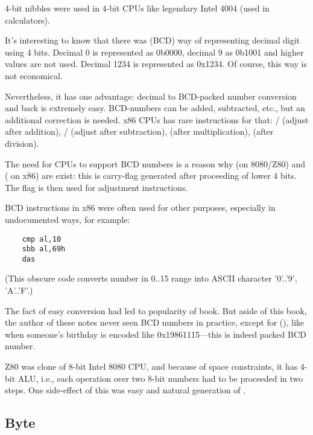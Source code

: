 
4-bit nibbles were used in 4-bit CPUs like legendary Intel 4004 (used in calculators).

It's interesting to know that there was  (\ac{BCD}) way of representing decimal digit using 4 bits.
Decimal 0 is represented as 0b0000, decimal 9 as 0b1001 and higher values are not used.
Decimal 1234 is represented as 0x1234.
Of course, this way is not economical.

Nevertheless, it has one advantage: decimal to \ac{BCD}-packed number conversion and back is extremely easy.
BCD-numbers can be added, subtracted, etc., but an additional correction is needed.
x86 CPUs has rare instructions for that:
/ (adjust after addition),
/ (adjust after subtraction),
 (after multiplication),
 (after division).

The need for CPUs to support \ac{BCD} numbers is a reason why  (on 8080/Z80) and
 ( on x86)
are exist: this is carry-flag generated after proceeding of lower 4 bits. The flag is then used for adjustment instructions.

\ac{BCD} instructions in x86 were often used for other purposes, especially in undocumented ways, for example:

\begin{lstlisting}
	cmp al,10
	sbb al,69h
	das
\end{lstlisting}

(This obscure code converts number in 0..15 range into \ac{ASCII} character '0'..'9', 'A'..'F'.)

The fact of easy conversion had led to popularity of
 book.
But aside of this book, the author of these notes never seen \ac{BCD} numbers in practice, except for
 (),
like when someone's birthday is encoded like 0x19861115---this is indeed packed \ac{BCD} number.


Z80 was clone of 8-bit Intel 8080 CPU, and because of space constraints, it has 4-bit \ac{ALU}, i.e., each operation
over two 8-bit numbers had to be proceeded in two steps.
One side-effect of this was easy and natural generation of .

\subsection{Byte}

